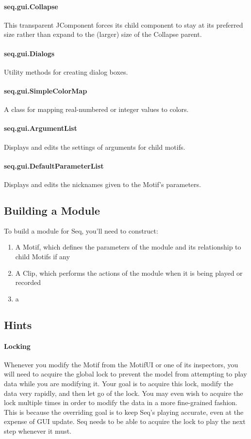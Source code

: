 \documentclass[twoside,10pt]{article}
\begin{document}
\paragraph{seq.gui.Collapse}  This transparent JComponent forces its child component to stay at its preferred size rather than expand to the (larger) size of the Collapse parent.

\paragraph{seq.gui.Dialogs}  Utility methods for creating dialog boxes.

\paragraph{seq.gui.SimpleColorMap}  A class for mapping real-numbered or integer values to colors.

\paragraph{seq.gui.ArgumentList} Displays and edits the settings of arguments for child motifs.

\paragraph{seq.gui.DefaultParameterList} Displays and edits the nicknames given to the Motif's parameters.

\subsection{Building a Module}

To build a module for Seq, you'll need to construct:

\begin{enumerate}
\item A Motif, which defines the parameters of the module and its relationship to child Motifs if any
\item A Clip, which performs the actions of the module when it is being played or recorded
\item a 
\end{enumerate}

\subsection{Hints}

\paragraph{Locking}
Whenever you modify the Motif from the MotifUI or one of its inspectors, you will need to acquire the global lock to prevent the model from attempting to play data while you are modifying it.  Your goal is to acquire this lock, modify the data very rapidly, and then let go of the lock.  You may even wish to acquire the lock multiple times in order to modify the data in a more fine-grained fashion.  This is because the overriding goal is to keep Seq's playing accurate, even at the expense of GUI update.  Seq needs to be able to acquire the lock to play the next step whenever it must.
\end{document}
